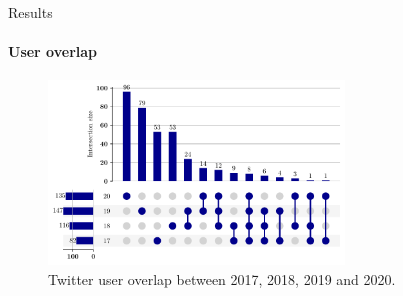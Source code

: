 \documentclass[9pt]{beamer}
\begin{document}
	\begin{frame}{Results}
	    \framesubtitle{User overlap}
\begin{figure}[t]
   \begin{minipage}[l]{1.0\columnwidth}
   \centering
   \includegraphics[width=0.7\textwidth]{images/overlap.pdf}
   \caption{Twitter user overlap between 2017, 2018, 2019 and 2020.}
   \label{fig:overlap}
   \end{minipage}
\end{figure}
	
	\end{frame}
\end{document}
